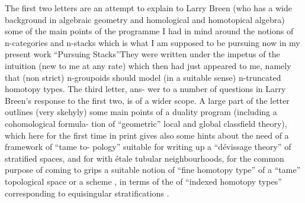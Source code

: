 The first two letters are an attempt to explain to Larry Breen (who
has a wide background in algebraic geometry and homological and homotopical
algebra) some of the main points of the programme I had in mind around the
notions of n-categories and n-stacks \hand{(}which is what I am supposed to be
pursuing now in my present work ``Pursuing Stacks''They were written under
the impetus of the  intuition  (new to me at any rate) which then had
just appeared to me, namely that (non strict) n-groupoids should model
(in a suitable sense) n-truncated homotopy types. The third letter,   ans-%
wer to a number of questions in Larry Breen's response to the first two,
is of a wider scope. A large part of the letter outlines (very skehyly)
some main points of a duality program (including a cohomological formula-%
tion of ``geometric'' local and global classfield theory), which 
here for the first time in print\hand{,}   gives also some hints about the need of a framework of ``tame to-%
pology'' suitable for writing up a ``dévissage theory'' of stratified spaces,
and for  with étale tubular neighbourhoods, for the common purpose
of coming to grips  a suitable notion of ``fine\unsure{\hand{,}} homotopy type'' of a ``tame''
topological space or  a scheme , in terms of the  of ``indexed
homotopy types'' corresponding to  equisingular stratifications .

